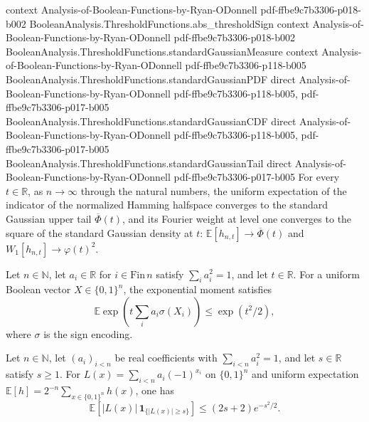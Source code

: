 \begin{theorem}
  {context}
  {Analysis-of-Boolean-Functions-by-Ryan-ODonnell}
  {pdf-ffbe9c7b3306-p018-b002}
\proofstep
  {BooleanAnalysis.ThresholdFunctions.abs_thresholdSign}
  {context}
  {Analysis-of-Boolean-Functions-by-Ryan-ODonnell}
  {pdf-ffbe9c7b3306-p018-b002}
\proofstep
  {BooleanAnalysis.ThresholdFunctions.standardGaussianMeasure}
  {context}
  {Analysis-of-Boolean-Functions-by-Ryan-ODonnell}
  {pdf-ffbe9c7b3306-p118-b005}
\proofstep
  {BooleanAnalysis.ThresholdFunctions.standardGaussianPDF}
  {direct}
  {Analysis-of-Boolean-Functions-by-Ryan-ODonnell}
  {pdf-ffbe9c7b3306-p118-b005,
    pdf-ffbe9c7b3306-p017-b005}
\proofstep
  {BooleanAnalysis.ThresholdFunctions.standardGaussianCDF}
  {direct}
  {Analysis-of-Boolean-Functions-by-Ryan-ODonnell}
  {pdf-ffbe9c7b3306-p118-b005,
    pdf-ffbe9c7b3306-p017-b005}
\proofstep
  {BooleanAnalysis.ThresholdFunctions.standardGaussianTail}
  {direct}
  {Analysis-of-Boolean-Functions-by-Ryan-ODonnell}
  {pdf-ffbe9c7b3306-p017-b005}
For every $t\in\mathbb R$, as $n\to\infty$ through the natural numbers, the uniform
expectation of the indicator of the normalized Hamming halfspace converges to the
standard Gaussian upper tail $\overline\Phi(t)$, and its Fourier weight at level one
converges to the square of the standard Gaussian density at $t$: $\mathbb
E[h_{n,t}]\to\overline\Phi(t)$ and $W_1[h_{n,t}]\to\varphi(t)^2$.
\end{theorem}

\begin{lemma}
\leanok
{}
Let $n\in\mathbb N$, let $a_i\in\mathbb R$ for $i\in\mathrm{Fin}\,n$ satisfy $\sum_i
a_i^2=1$, and let $t\in\mathbb R$. For a uniform Boolean vector $X\in\{0,1\}^n$, the
exponential moment satisfies
\[\mathbb E\exp\!\left(t\sum_i a_i\sigma(X_i)\right)\leq\exp(t^2/2),\]
where $\sigma$ is the sign encoding.
\end{lemma}

\begin{theorem}
\leanok
{}
Let $n\in\mathbb N$, let $(a_i)_{i<n}$ be real coefficients with $\sum_{i<n}a_i^2=1$, and let $s\in\mathbb R$ satisfy $s\ge1$.
For $L(x)=\sum_{i<n}a_i(-1)^{x_i}$ on $\{0,1\}^n$ and uniform expectation $\mathbb E[h]=2^{-n}\sum_{x\in\{0,1\}^n}h(x)$, one has
\[
\mathbb E\!\left[|L(x)|\,\mathbf 1_{\{|L(x)|\ge s\}}\right]
 \le (2s+2)e^{-s^2/2}.
\]
\end{theorem}

